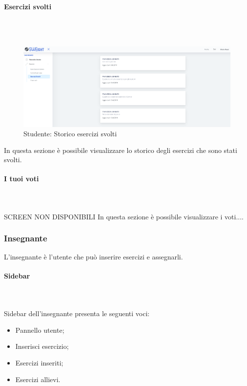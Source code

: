         \paragraph{Esercizi svolti}\mbox{}\\ \\
        	\begin{figure}[H]
            	\centering
            	\includegraphics[width=17cm]{sez/img/studente/esercizisvolti.PNG} 
            	\caption{Studente: Storico esercizi svolti}\label{fig:1}
        	\end{figure}
          In questa sezione è possibile visualizzare  lo storico degli esercizi che sono stati svolti.
        
        
        
        
        \paragraph{I tuoi voti}\mbox{}\\ \\
          SCREEN NON DISPONIBILI
          In questa sezione è possibile visualizzare i voti....
        
        
        
        
        
\newpage
    \subsubsection{Insegnante}
      L'insegnante è l'utente che può inserire esercizi e assegnarli.
        \paragraph{Sidebar}\mbox{}\\ \\
          Sidebar dell'insegnante presenta le seguenti voci:
        	\begin{itemize}
            	\item Pannello utente;
            	\item Inserisci esercizio;
            	\item Esercizi inseriti;
            	\item Esercizi allievi.
        	\end{itemize}
        
